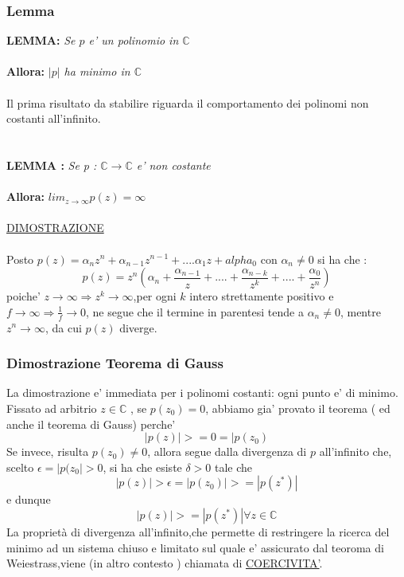 \documentclass[fontsize = 20px, paper = a4]{article}
\begin{document}
\subsubsection{Lemma}
\textbf{LEMMA: }\emph{Se $p$ e' un polinomio in $\mathbb{C}$}\\ \\
\textbf{Allora: } \emph{$|p|$ ha minimo in $\mathbb{C}$} \\\\
Il prima risultato da stabilire riguarda il comportamento dei polinomi non costanti all'infinito. \\ \\  \\
\textbf{LEMMA :} \emph{ Se p : $\mathbb{C}\rightarrow \mathbb{C}$ e' non costante} \\ \\
\textbf{Allora:} \emph{ $lim_{z \to \infty} p(z) = \infty $} \\ \\
\underline{DIMOSTRAZIONE} \\ \\
 Posto $p(z) = \alpha_{n}z^n + \alpha_{n-1}z^{n-1} +....\alpha_{1}z + alpha_{0}$ con $\alpha_{n} \neq 0$ si ha che :
$$p(z) = z^n(\alpha_{n} + \frac{\alpha_{n-1}}{z} + .... +\frac{\alpha_{n-k}}
{z^k} + .... +\frac{\alpha_{0}}{z^n}) $$
poiche' $ z \to \infty \Longrightarrow z^k \to \infty$,per ogni $k$ intero strettamente positivo e $f\rightarrow \infty \Longrightarrow \frac{1}{f} \rightarrow 0$, ne segue che il termine in parentesi tende a $\alpha_{n} \neq 0$, mentre $z^n \to \infty$, da cui $p(z)$ diverge.
\subsubsection{Dimostrazione Teorema di Gauss}
La dimostrazione e' immediata per i polinomi costanti: ogni punto e' di minimo.\\
Fissato ad arbitrio $ z \in \mathbb{C}$ , se $p(z_{0}) = 0$, abbiamo gia' provato il teorema ( ed anche il teorema di Gauss) perche' 
$$|p(z)| >= 0 = |p(z_{0})$$
Se invece, risulta $p(z_{0}) \neq 0$, allora segue dalla divergenza di $p$ all'infinito che, scelto $\epsilon = |p(z_{0}| > 0$, si ha che esiste $\delta > 0$ tale che 
$$ |p(z)| >\epsilon = |p(z_{0})| >= |p(z^*)|$$
e dunque 
$$|p(z)| >= |p(z^*)| \forall z \in \mathbb{C}$$
La proprietà di divergenza all'infinito,che permette di restringere la ricerca del minimo ad un sistema chiuso e limitato sul quale e' assicurato dal teoroma di Weiestrass,viene (in altro contesto ) chiamata di \underline{COERCIVITA'}.
\end{document}
